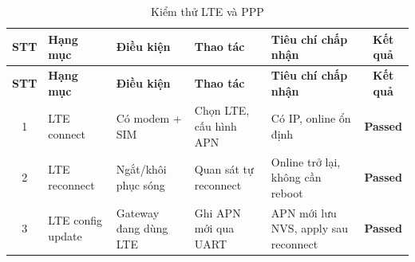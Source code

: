         \begin{longtable}{|c|p{}|p{}|p{}|p{}|c|}
            \caption{Kiểm thử LTE và PPP}
            \label{tab:test_lte_ppp} \\
            \hline
            \textbf{STT} & \textbf{Hạng mục} & \textbf{Điều kiện} & \textbf{Thao tác} & \textbf{Tiêu chí chấp nhận} & \textbf{Kết quả} \\ \hline
            \endfirsthead
        
            \hline
            \textbf{STT} & \textbf{Hạng mục} & \textbf{Điều kiện} & \textbf{Thao tác} & \textbf{Tiêu chí chấp nhận} & \textbf{Kết quả} \\ \hline
            \endhead
        
            \hline
            \endfoot
            \endlastfoot
        
            1 & LTE connect & Có modem + SIM & Chọn LTE, cấu hình APN & Có IP, online ổn định & \textcolor{modern_blue}{\textbf{Passed}} \\ \hline
            2 & LTE reconnect & Ngắt/khôi phục sóng & Quan sát tự reconnect & Online trở lại, không cần reboot & \textcolor{modern_blue}{\textbf{Passed}} \\ \hline
            3 & LTE config update & Gateway đang dùng LTE & Ghi APN mới qua UART & APN mới lưu NVS, apply sau reconnect & \textcolor{modern_blue}{\textbf{Passed}} \\ \hline
        \end{longtable}
        

